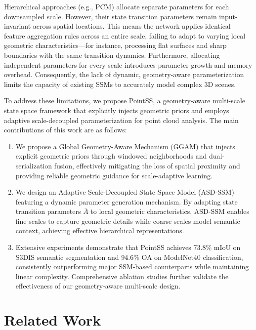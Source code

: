\documentclass[a4paper,fleqn]{cas-dc}
\begin{document}
Hierarchical approaches (e.g., PCM) allocate separate parameters for each downsampled scale. However, their state transition parameters remain input-invariant across spatial locations. This means the network applies identical feature aggregation rules across an entire scale, failing to adapt to varying local geometric characteristics---for instance, processing flat surfaces and sharp boundaries with the same transition dynamics. Furthermore, allocating independent parameters for every scale introduces parameter growth and memory overhead. Consequently, the lack of dynamic, geometry-aware parameterization limits the capacity of existing SSMs to accurately model complex 3D scenes.


To address these limitations, we propose PointSS, a geometry-aware
multi-scale state space framework that explicitly injects geometric
priors and employs adaptive scale-decoupled parameterization for point cloud
analysis. The main contributions of this work are as follows:

  \begin{enumerate}
	\item We propose a Global Geometry-Aware Mechanism (GGAM) that injects
	explicit geometric priors through windowed neighborhoods and dual-
	serialization fusion, effectively mitigating the loss of spatial proximity
	and providing reliable geometric guidance for scale-adaptive learning.
	
	\item We design an Adaptive Scale-Decoupled State Space Model (ASD-SSM)
	featuring a dynamic parameter generation mechanism. By adapting state
	transition parameters $\bar{A}$ to local geometric characteristics, ASD-SSM
	enables fine scales to capture geometric details while coarse scales model
	semantic context, achieving effective hierarchical representations.
	
	\item Extensive experiments demonstrate that PointSS achieves 73.8\% mIoU
	on S3DIS semantic segmentation and 94.6\% OA on ModelNet40 classification,
	consistently outperforming major SSM-based counterparts while maintaining linear complexity.
	Comprehensive ablation studies further validate the effectiveness of our
	geometry-aware multi-scale design.
\end{enumerate}



\section{Related Work}
\end{document}

